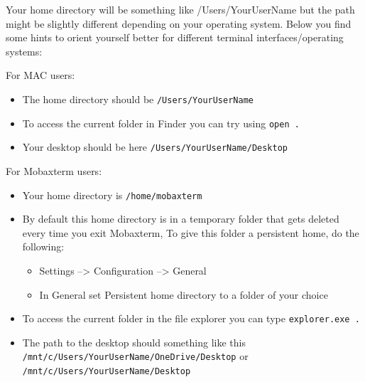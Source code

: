 \documentclass[
  letterpaper,
  DIV=11,
  numbers=noendperiod]{scrreprt}
\providecommand{\tightlist}{%
  \setlength{\itemsep}{0pt}\setlength{\parskip}{0pt}}\usepackage{longtable,booktabs,array}
\begin{document}
\begin{tcolorbox}[enhanced jigsaw, title=\textcolor{quarto-callout-tip-color}{\faLightbulb}\hspace{0.5em}{Tip: finding the desktop on different user systems}, colframe=quarto-callout-tip-color-frame, opacitybacktitle=0.6, rightrule=.15mm, arc=.35mm, left=2mm, colbacktitle=quarto-callout-tip-color!10!white, bottomrule=.15mm, leftrule=.75mm, toprule=.15mm, opacityback=0, bottomtitle=1mm, colback=white, toptitle=1mm, breakable, titlerule=0mm, coltitle=black]

Your home directory will be something like /Users/YourUserName but the
path might be slightly different depending on your operating system.
Below you find some hints to orient yourself better for different
terminal interfaces/operating systems:

For MAC users:

\begin{itemize}
\tightlist
\item
  The home directory should be \texttt{/Users/YourUserName}
\item
  To access the current folder in Finder you can try using
  \texttt{open\ .}
\item
  Your desktop should be here \texttt{/Users/YourUserName/Desktop}
\end{itemize}

For Mobaxterm users:

\begin{itemize}
\tightlist
\item
  Your home directory is \texttt{/home/mobaxterm}
\item
  By default this home directory is in a temporary folder that gets
  deleted every time you exit Mobaxterm, To give this folder a
  persistent home, do the following:

  \begin{itemize}
  \tightlist
  \item
    Settings --\textgreater{} Configuration --\textgreater{} General
  \item
    In General set Persistent home directory to a folder of your choice
  \end{itemize}
\item
  To access the current folder in the file explorer you can type
  \texttt{explorer.exe\ .}
\item
  The path to the desktop should something like this
  \texttt{/mnt/c/Users/YourUserName/OneDrive/Desktop} or
  \texttt{/mnt/c/Users/YourUserName/Desktop}
\end{itemize}


\end{tcolorbox}
\end{document}
